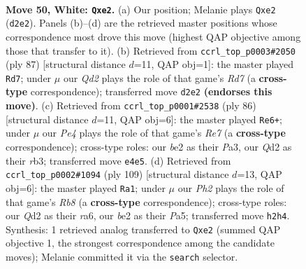 \documentclass[11pt]{article}
\begin{document}
\clearpage

\begin{figure}[p]\centering
\begin{subfigure}{0.46\textwidth}\centering
\resizebox{\linewidth}{!}{%
\newchessgame
\chessboard[
  setfen={8/1p6/4k3/8/r3P3/8/3Qb1PP/1K6 w - - 2 50},
  showmover=false,
  pgfstyle=straightmove, color=movearrow, markmove={d2-e2}
]}
\caption{}
\end{subfigure}\hfill
\begin{subfigure}{0.46\textwidth}\centering
\resizebox{\linewidth}{!}{%
\newchessgame
\chessboard[
  setfen={5k1B/7p/8/p5R1/4Kp2/8/3r4/8 b - - 4 44},
  showmover=false,
  pgfstyle=straightmove, color=movearrow, markmove={d2-d7}
]}
\caption{}
\end{subfigure}
\\[4pt]
\begin{subfigure}{0.46\textwidth}\centering
\resizebox{\linewidth}{!}{%
\newchessgame
\chessboard[
  setfen={8/4R3/3p3k/b2P4/8/Pr5P/8/2K5 w - - 0 44},
  showmover=false,
  pgfstyle=straightmove, color=movearrow, markmove={e7-e6}
]}
\caption{}
\end{subfigure}\hfill
\begin{subfigure}{0.46\textwidth}\centering
\resizebox{\linewidth}{!}{%
\newchessgame
\chessboard[
  setfen={8/4k3/R6p/p4p2/B7/8/7K/1r6 b - - 21 55},
  showmover=false,
  pgfstyle=straightmove, color=movearrow, markmove={b1-a1}
]}
\caption{}
\end{subfigure}
\caption{\textbf{Move 50, White: \texttt{Qxe2}.} (a) Our position; Melanie plays \texttt{Qxe2} (\texttt{d2e2}). Panels (b)--(d) are the retrieved master positions whose correspondence most drove this move (highest QAP objective among those that transfer to it). (b) Retrieved from \texttt{ccrl\_top\_p0003\#2050} (ply 87) [structural distance $d$=11, QAP obj=1]: the master played \texttt{Rd7}; under $\mu$ our \emph{Qd2} plays the role of that game's \emph{Rd7} (a \textbf{cross-type} correspondence); transferred move \texttt{d2e2} \textbf{(endorses this move)}. (c) Retrieved from \texttt{ccrl\_top\_p0001\#2538} (ply 86) [structural distance $d$=11, QAP obj=6]: the master played \texttt{Re6+}; under $\mu$ our \emph{Pe4} plays the role of that game's \emph{Re7} (a \textbf{cross-type} correspondence); cross-type roles: our \emph{b}e2 as their \emph{P}a3, our \emph{Q}d2 as their \emph{r}b3; transferred move \texttt{e4e5}. (d) Retrieved from \texttt{ccrl\_top\_p0002\#1094} (ply 109) [structural distance $d$=13, QAP obj=6]: the master played \texttt{Ra1}; under $\mu$ our \emph{Ph2} plays the role of that game's \emph{Rb8} (a \textbf{cross-type} correspondence); cross-type roles: our \emph{Q}d2 as their \emph{r}a6, our \emph{b}e2 as their \emph{P}a5; transferred move \texttt{h2h4}. Synthesis: 1 retrieved analog transferred to \texttt{Qxe2} (summed QAP objective 1, the strongest correspondence among the candidate moves); Melanie committed it via the \texttt{search} selector.}
\label{fig:thought-m98}
\end{figure}
\end{document}
